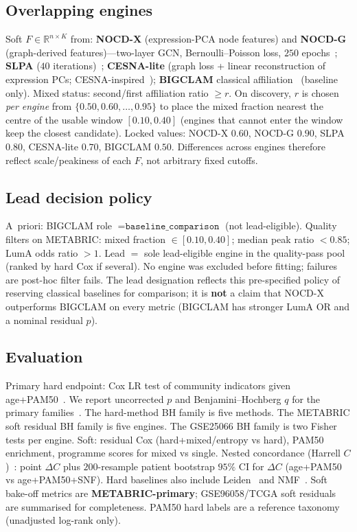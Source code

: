 \documentclass[11pt,a4paper]{article}
\begin{document}
\subsection{Overlapping engines}
Soft $F\in\mathbb{R}^{n\times K}$ from: \textbf{NOCD-X} (expression-PCA node features) and \textbf{NOCD-G} (graph-derived features)---two-layer GCN, Bernoulli--Poisson loss, $250$ epochs~\cite{ref_nocd}; \textbf{SLPA} ($40$ iterations)~\cite{ref_slpa}; \textbf{CESNA-lite} (graph loss + linear reconstruction of expression PCs; CESNA-inspired~\cite{ref_cesna}); \textbf{BIGCLAM} classical affiliation~\cite{ref_bigclam} (baseline only). Mixed status: second/first affiliation ratio $\ge r$. On discovery, $r$ is chosen \emph{per engine} from $\{0.50,0.60,\ldots,0.95\}$ to place the mixed fraction nearest the centre of the usable window $[0.10,0.40]$ (engines that cannot enter the window keep the closest candidate). Locked values: NOCD-X $0.60$, NOCD-G $0.90$, SLPA $0.80$, CESNA-lite $0.70$, BIGCLAM $0.50$. Differences across engines therefore reflect scale/peakiness of each $F$, not arbitrary fixed cutoffs.

\subsection{Lead decision policy}
A~priori: BIGCLAM role $=\texttt{baseline\_comparison}$ (not lead-eligible). Quality filters on METABRIC: mixed fraction $\in[0.10,0.40]$; median peak ratio $<0.85$; LumA odds ratio $>1$. Lead $=$ sole lead-eligible engine in the quality-pass pool (ranked by hard Cox if several). No engine was excluded before fitting; failures are post-hoc filter fails. The lead designation reflects this pre-specified policy of reserving classical baselines for comparison; it is \textbf{not} a claim that NOCD-X outperforms BIGCLAM on every metric (BIGCLAM has stronger LumA OR and a nominal residual $p$).

\subsection{Evaluation}
Primary hard endpoint: Cox LR test of community indicators given age+PAM50~\cite{ref_cox}. We report uncorrected $p$ and Benjamini--Hochberg $q$ for the primary families~\cite{ref_bh}. The hard-method BH family is five methods. The METABRIC soft residual BH family is five engines. The GSE25066 BH family is two Fisher tests per engine. Soft: residual Cox (hard+mixed/entropy vs hard), PAM50 enrichment, programme scores for mixed vs single. Nested concordance (Harrell $C$)~\cite{ref_harrell}: point $\Delta C$ plus $200$-resample patient bootstrap $95\%$ CI for $\Delta C$ (age+PAM50 vs age+PAM50+SNF). Hard baselines also include Leiden~\cite{ref_leiden} and NMF~\cite{ref_nmf}. Soft bake-off metrics are \textbf{METABRIC-primary}; GSE96058/TCGA soft residuals are summarised for completeness. PAM50 hard labels are a reference taxonomy (unadjusted log-rank only).
\end{document}
